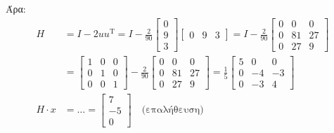 \documentclass[11pt,a4paper,notitlepage,fleqn,final]{article}
\begin{document}
Άρα:
\begin{align*}
	H &= I-2uu^{\mathrm T} = I - \frac{2}{90}\left[\begin{matrix}
	0\\9\\3
	\end{matrix}\right]\left[\begin{matrix}
	0&9&3
	\end{matrix}\right] = I-\frac{2}{90}\left[\begin{matrix}
	0&0&0\\0&81&27\\0&27&9
	\end{matrix}\right] \\ &= \left[\begin{matrix}
	1&0&0\\0&1&0\\0&0&1
	\end{matrix}\right] - \frac{2}{90}\left[\begin{matrix}
	0&0&0\\0&81&27\\0&27&9
	\end{matrix}\right] = \frac{1}{5}\left[\begin{matrix}
	5&0&0\\0&-4&-3\\0&-3&4
	\end{matrix}\right] \\
	H\cdot x &= \dots = \left[\begin{matrix}
	7\\-5\\0
	\end{matrix}\right] \quad \text{(επαλήθευση)}
\end{align*}
\end{document}
